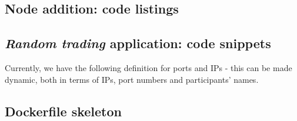 \documentclass[12pt,twoside]{article}
\begin{document}
\subsection*{Node addition: code listings}

\newpage

\newpage
\subsection*{\textit{Random trading} application: code snippets}



Currently, we have the following definition for ports and IPs - this can be made dynamic, both in terms of IPs, port numbers and participants' names. 

\newpage
\subsection*{Dockerfile skeleton}

\end{document}
